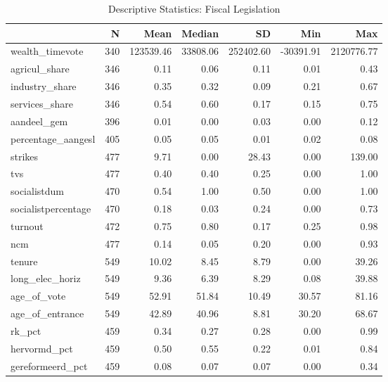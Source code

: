 \begin{table}

\caption{\label{tab:descriptives_fiscal}Descriptive Statistics: Fiscal Legislation}
\centering
\begin{tabular}[t]{lrrrrrr}
\toprule
  & N & Mean & Median & SD & Min & Max\\
\midrule
wealth\_timevote & 340 & 123539.46 & 33808.06 & 252402.60 & -30391.91 & 2120776.77\\
agricul\_share & 346 & 0.11 & 0.06 & 0.11 & 0.01 & 0.43\\
industry\_share & 346 & 0.35 & 0.32 & 0.09 & 0.21 & 0.67\\
services\_share & 346 & 0.54 & 0.60 & 0.17 & 0.15 & 0.75\\
aandeel\_gem & 396 & 0.01 & 0.00 & 0.03 & 0.00 & 0.12\\
percentage\_aangesl & 405 & 0.05 & 0.05 & 0.01 & 0.02 & 0.08\\
strikes & 477 & 9.71 & 0.00 & 28.43 & 0.00 & 139.00\\
tvs & 477 & 0.40 & 0.40 & 0.25 & 0.00 & 1.00\\
socialistdum & 470 & 0.54 & 1.00 & 0.50 & 0.00 & 1.00\\
socialistpercentage & 470 & 0.18 & 0.03 & 0.24 & 0.00 & 0.73\\
turnout & 472 & 0.75 & 0.80 & 0.17 & 0.25 & 0.98\\
ncm & 477 & 0.14 & 0.05 & 0.20 & 0.00 & 0.93\\
tenure & 549 & 10.02 & 8.45 & 8.79 & 0.00 & 39.26\\
long\_elec\_horiz & 549 & 9.36 & 6.39 & 8.29 & 0.08 & 39.88\\
age\_of\_vote & 549 & 52.91 & 51.84 & 10.49 & 30.57 & 81.16\\
age\_of\_entrance & 549 & 42.89 & 40.96 & 8.81 & 30.20 & 68.67\\
rk\_pct & 459 & 0.34 & 0.27 & 0.28 & 0.00 & 0.99\\
hervormd\_pct & 459 & 0.50 & 0.55 & 0.22 & 0.01 & 0.84\\
gereformeerd\_pct & 459 & 0.08 & 0.07 & 0.07 & 0.00 & 0.34\\
\bottomrule
\end{tabular}
\end{table}
